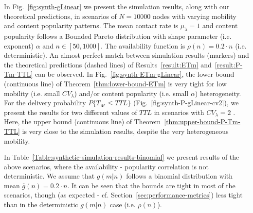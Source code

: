 \documentclass[journal]{IEEEtran}
\begin{document}
In Fig.~\ref{fig:synth-gLinear} we present the simulation results, along with our theoretical predictions, in scenarios of $N=10000$ nodes with varying mobility and content popularity patterns. The mean contact rate is $\mu_{\lambda}=1$ and content popularity follows a Bounded Pareto distribution with shape parameter (i.e. exponent) $\alpha$ and $n\in[50, 1000]$. The availability function is $\rho(n)=0.2\cdot n$ (i.e. deterministic). An almost perfect match between simulation results (markers) and the theoretical predictions (dashed lines) of Results~\ref{result:ETm} and~\ref{result:P-Tm-TTL} can be observed. In Fig.~\ref{fig:synth-ETm-gLinear}, the lower bound (continuous line) of Theorem~\ref{thm:lower-bound-ETm} is very tight for low mobility (i.e. small $CV_{\lambda}$) and/or content popularity (i.e. small $\alpha$) heterogeneity. For the delivery probability $P\lbrace T_{\mathcal{M}}\leq TTL\rbrace$ (Fig.~\ref{fig:synth-P-gLinear-cv2}), we present the results for two different values of $TTL$ in scenarios with $CV_{\lambda}=2$ . Here, the upper bound (continuous line) of Theorem~\ref{thm:upper-bound-P-Tm-TTL} is very close to the simulation results, despite the very heterogeneous mobility.


In Table~\ref{Table:synthetic-simulation-results-binomial} we present results of the above scenarios, where the availability - popularity correlation is not deterministic. We assume that $g(m|n)$ follows a binomial distribution with mean $\overline{g}(n) = 0.2\cdot n$.  It can be seen that the bounds are tight in most of the scenarios, though (as expected - cf. Section~\ref{sec:performance-metrics}) less tight than in the deterministic $g(m|n)$ case (i.e. $\rho(n)$).
\end{document}

